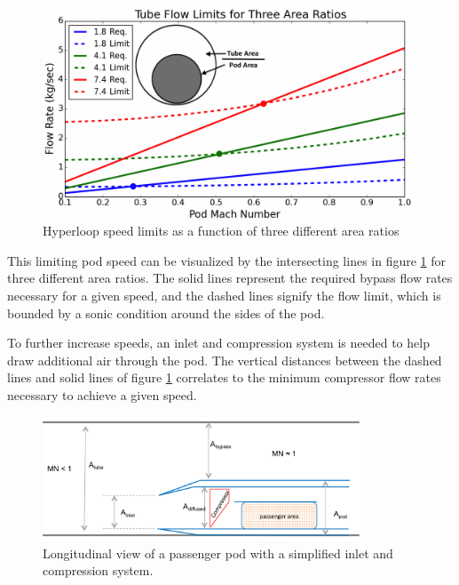 \documentclass[heading.tex]{subfiles}
\begin{document}
\begin{figure}[hbtp]
\centering
\includegraphics[width=\textwidth]{images/tube_flow_limit3.png}
\caption{Hyperloop speed limits as a function of three different area ratios}
\label{f:flowLIMIT}
\end{figure}

This limiting pod speed can be visualized by the intersecting lines in figure \ref{f:flowLIMIT} for three different area ratios.
The solid lines represent the required bypass flow rates necessary for a given speed,
and the dashed lines signify the flow limit, which is bounded by a sonic condition around the sides of the pod.


To further increase speeds, an inlet and compression system is needed to help draw additional air through the pod.
The vertical distances between the dashed lines and solid lines of figure \ref{f:flowLIMIT} correlates to the
minimum compressor flow rates necessary to achieve a given speed. 

\begin{figure}[hbtp]
\centering
\includegraphics[width=0.85\textwidth]{images/openCapsule.png}
\caption{Longitudinal view of a passenger pod with a simplified inlet and compression system.}
\label{f:OpenPod}
\end{figure}
\end{document}
